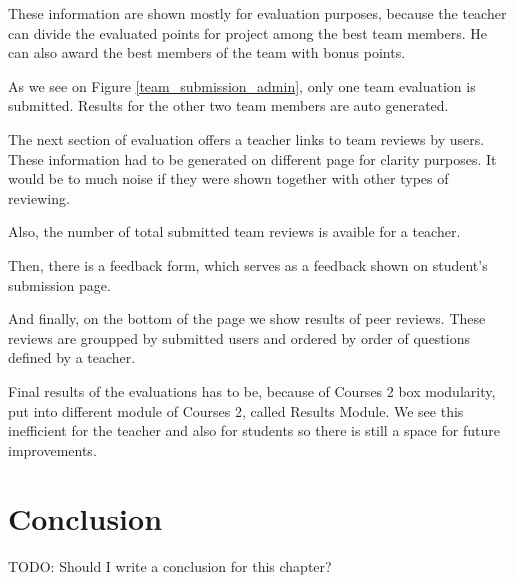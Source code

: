 These information are shown mostly for evaluation purposes, because the teacher can divide the evaluated points for project among the best team members. He can also award the best members of the team with bonus points.


As we see on Figure \ref{team_submission_admin}, only one team evaluation is submitted. Results for the other two team members are auto generated.

The next section of evaluation offers a teacher links to team reviews by users. These information had to be generated on different page for clarity purposes. It would be to much noise if they were shown together with other types of reviewing.

Also, the number of total submitted team reviews is avaible for a teacher.

Then, there is a feedback form, which serves as a feedback shown on student's submission page.


And finally, on the bottom of the page we show results of peer reviews. These reviews are groupped by submitted users and ordered by order of questions defined by a teacher.

Final results of the evaluations has to be, because of Courses 2 box modularity, put into different module of Courses 2, called Results Module. We see this inefficient for the teacher and also for students so there is still a space for future improvements.


\section{Conclusion}
TODO: Should I write a conclusion for this chapter?
